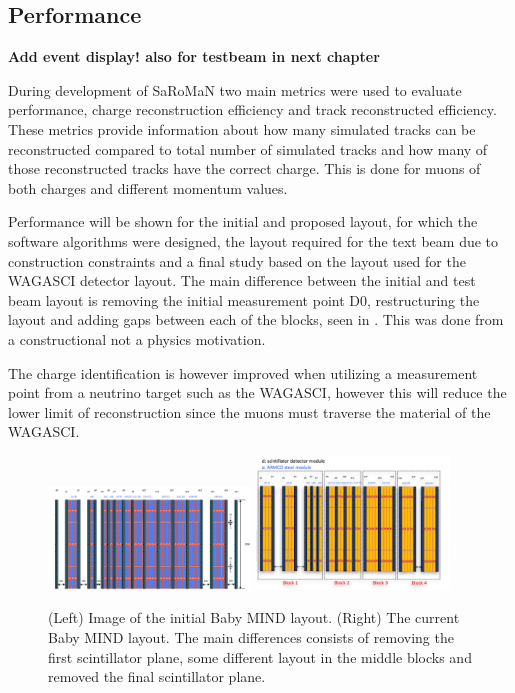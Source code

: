\subsection{Performance}

\textbf{Add event display! also for testbeam in next chapter}

During development of SaRoMaN two main metrics were used to evaluate performance, charge reconstruction efficiency and track reconstructed efficiency. These metrics provide information about how many simulated tracks can be reconstructed compared to total number of simulated tracks and how many of those reconstructed tracks have the correct charge. This is done for muons of both charges and different momentum values.

Performance will be shown for the initial and proposed layout, for which the software algorithms were designed, the layout required for the text beam due to construction constraints and a final study based on the layout used for the WAGASCI detector layout. The main difference between the initial and test beam layout is removing the initial measurement point D0, restructuring  the layout and adding gaps between each of the blocks, seen in . This was done from a constructional not a physics motivation.

The charge identification is however improved when utilizing a measurement point from a neutrino target such as the WAGASCI, however this will reduce the lower limit of reconstruction since the muons must traverse the material of the WAGASCI. 

\begin{figure}[h!]
\centering
\includegraphics[width=0.48\textwidth]{figures/oldStudies/oldMIND.png}
\includegraphics[width=0.46\textwidth]{figures/MIND.jpeg}
\caption{(Left) Image of the initial Baby MIND layout. (Right) The current Baby MIND layout. The main differences consists of removing the first scintillator plane, some different layout in the middle blocks and removed the final scintillator plane.}
\label{fig:oldMIND}
\end{figure}

